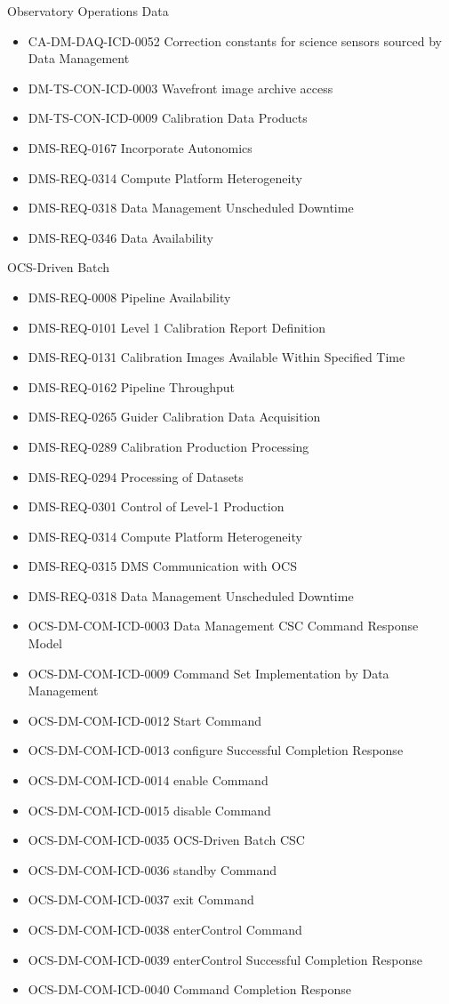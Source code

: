 Observatory Operations Data \begin{itemize}
\item CA-DM-DAQ-ICD-0052 Correction constants for science sensors sourced by Data Management
\item DM-TS-CON-ICD-0003 Wavefront image archive access
\item DM-TS-CON-ICD-0009 Calibration Data Products
\item DMS-REQ-0167 Incorporate Autonomics
\item DMS-REQ-0314 Compute Platform Heterogeneity
\item DMS-REQ-0318 Data Management Unscheduled Downtime
\item DMS-REQ-0346 Data Availability
\end{itemize}
OCS-Driven Batch \begin{itemize}
\item DMS-REQ-0008 Pipeline Availability
\item DMS-REQ-0101 Level 1 Calibration Report Definition
\item DMS-REQ-0131 Calibration Images Available Within Specified Time
\item DMS-REQ-0162 Pipeline Throughput
\item DMS-REQ-0265 Guider Calibration Data Acquisition
\item DMS-REQ-0289 Calibration Production Processing
\item DMS-REQ-0294 Processing of Datasets
\item DMS-REQ-0301 Control of Level-1 Production
\item DMS-REQ-0314 Compute Platform Heterogeneity
\item DMS-REQ-0315 DMS Communication with OCS
\item DMS-REQ-0318 Data Management Unscheduled Downtime
\item OCS-DM-COM-ICD-0003 Data Management CSC Command Response Model
\item OCS-DM-COM-ICD-0009 Command Set Implementation by Data Management
\item OCS-DM-COM-ICD-0012 Start Command
\item OCS-DM-COM-ICD-0013 configure Successful Completion Response
\item OCS-DM-COM-ICD-0014 enable Command
\item OCS-DM-COM-ICD-0015 disable Command
\item OCS-DM-COM-ICD-0035 OCS-Driven Batch CSC
\item OCS-DM-COM-ICD-0036 standby Command
\item OCS-DM-COM-ICD-0037 exit Command
\item OCS-DM-COM-ICD-0038 enterControl Command
\item OCS-DM-COM-ICD-0039 enterControl Successful Completion Response
\item OCS-DM-COM-ICD-0040 Command Completion Response
\end{itemize}
